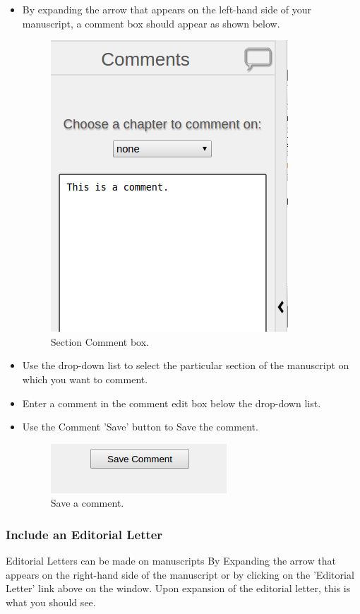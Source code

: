\begin{itemize}
	\item By expanding the arrow that appears on the left-hand side of your manuscript, a comment box should appear as shown below.
	
	\begin{figure}[h]
			\centering
			\includegraphics[scale=0.6]{images/SectionComment.png}
			\caption{Section Comment box.}
		\end{figure} 
		
	\item Use the drop-down list to select the particular section of the manuscript on which you want to comment.
	\item Enter a comment in the comment edit box below the drop-down list.
	\item Use the Comment 'Save' button to Save the comment. 	
	
	\begin{figure}[h]
			\centering
			\includegraphics[scale=0.6]{images/CommentSaveButton.png}
			\caption{Save a comment.}
		\end{figure} 
\end{itemize}

\newpage
\subsubsection{Include an Editorial Letter}
Editorial Letters can be made on manuscripts By Expanding the arrow that appears on the right-hand side of the manuscript or by clicking on the 'Editorial Letter' link above on the window. Upon expansion of the editorial letter, this is what you should see.

